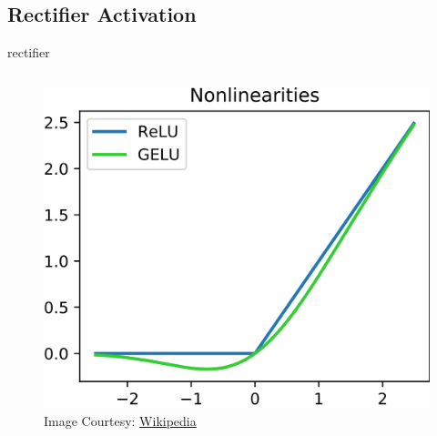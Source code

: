 \documentclass[aspectratio=169,xcolor={dvipsnames,svgnames}]{beamer}
\begin{document}
\subsection{Rectifier Activation}
\label{sec:orgf33426f}
\begin{frame}[label={sec:rectifier-activation}]{rectifier}
\begin{columns}
\begin{column}{0.45\columnwidth}
\begin{figure}[htbp]
\centering
\includegraphics[width=.9\linewidth]{org-download-images/details/2024-09-16_22-52-05_screenshot.png}
\caption{Image Courtesy: \href{https://commons.wikimedia.org/wiki/File:ReLU\_and\_GELU.svg}{Wikipedia}}
\end{figure}
\end{column}


\end{columns}
\end{frame}
\end{document}
